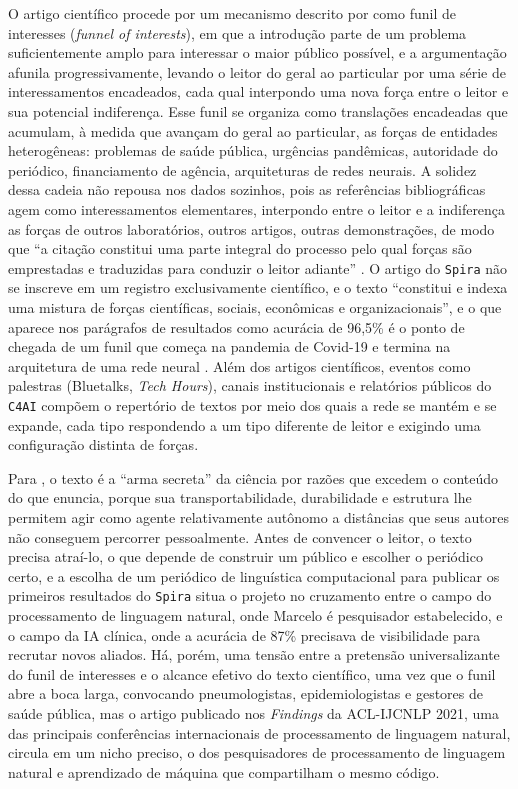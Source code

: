 O artigo científico procede por um mecanismo descrito por \textcite{Law1986Laboratories} como funil de interesses (\textit{funnel of interests}), em que a introdução parte de um problema suficientemente amplo para interessar o maior público possível, e a argumentação afunila progressivamente, levando o leitor do geral ao particular por uma série de interessamentos encadeados, cada qual interpondo uma nova força entre o leitor e sua potencial indiferença. Esse funil se organiza como translações encadeadas que acumulam, à medida que avançam do geral ao particular, as forças de entidades heterogêneas: problemas de saúde pública, urgências pandêmicas, autoridade do periódico, financiamento de agência, arquiteturas de redes neurais. A solidez dessa cadeia não repousa nos dados sozinhos, pois as referências bibliográficas agem como interessamentos elementares, interpondo entre o leitor e a indiferença as forças de outros laboratórios, outros artigos, outras demonstrações, de modo que \enquote{a citação constitui uma parte integral do processo pelo qual forças são emprestadas e traduzidas para conduzir o leitor adiante} \parencite[p.~79]{Law1986Laboratories}. O artigo do \texttt{Spira} não se inscreve em um registro exclusivamente científico, e o texto \enquote{constitui e indexa uma mistura de forças científicas, sociais, econômicas e organizacionais}, e o que aparece nos parágrafos de resultados como acurácia de 96,5\% é o ponto de chegada de um funil que começa na pandemia de Covid-19 e termina na arquitetura de uma rede neural \parencite[p.~79]{Law1986Laboratories}. Além dos artigos científicos, eventos como palestras (Bluetalks, \textit{Tech Hours}), canais institucionais e relatórios públicos do \texttt{C4AI} compõem o repertório de textos por meio dos quais a rede se mantém e se expande, cada tipo respondendo a um tipo diferente de leitor e exigindo uma configuração distinta de forças.

Para \textcite{Law1986Laboratories}, o texto é a \enquote{arma secreta} da ciência por razões que excedem o conteúdo do que enuncia, porque sua transportabilidade, durabilidade e estrutura lhe permitem agir como agente relativamente autônomo a distâncias que seus autores não conseguem percorrer pessoalmente. Antes de convencer o leitor, o texto precisa atraí-lo, o que depende de construir um público e escolher o periódico certo, e a escolha de um periódico de linguística computacional para publicar os primeiros resultados do \texttt{Spira} situa o projeto no cruzamento entre o campo do processamento de linguagem natural, onde Marcelo é pesquisador estabelecido, e o campo da IA clínica, onde a acurácia de 87\% precisava de visibilidade para recrutar novos aliados. Há, porém, uma tensão entre a pretensão universalizante do funil de interesses e o alcance efetivo do texto científico, uma vez que o funil abre a boca larga, convocando pneumologistas, epidemiologistas e gestores de saúde pública, mas o artigo publicado nos \textit{Findings} da ACL-IJCNLP 2021, uma das principais conferências internacionais de processamento de linguagem natural, circula em um nicho preciso, o dos pesquisadores de processamento de linguagem natural e aprendizado de máquina que compartilham o mesmo código.

